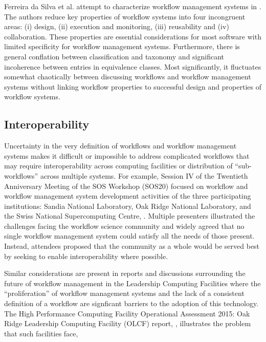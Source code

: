 Ferreira da Silva et al. attempt to characterize workflow management systems in 
\cite{ferreira_da_silva_characterization_nodate}. The authors reduce key properties of workflow
systems into four incongruent areas: (i) design, (ii) execution and monitoring, (iii)
reusability and (iv) collaboration. These properties are essential
considerations for most  software with limited specificity for workflow
management systems. Furthermore, there is general conflation between
classification and taxonomy and significant incoherence between entries in
equivalence classes. Most significantly, it fluctuates somewhat chaotically
between discussing workflows and workflow management systems without linking
workflow properties to successful design and properties of workflow systems.

\subsection{Interoperability}

Uncertainty in the very definition of workflows and workflow management systems makes it
difficult or impossible to address complicated workflows that may require interoperability
across computing facilities or distribution of ``sub-workflows'' across multiple systems.
For example, Session IV of the Twentieth Anniversary Meeting of the SOS Workshop
(SOS20) focused on workflow and workflow management
system development activities of the three participating institutions: Sandia
National Laboratory, Oak Ridge National Laboratory, and the Swiss National Supercomputing
Centre, \cite{pack_sos20_2016}. Multiple
presenters illustrated the challenges facing the workflow science community and
widely agreed that no single workflow management system could satisfy
all the needs of those present. Instead, attendees proposed that the community as a whole would
be served best by seeking to enable interoperability where possible. 

Similar considerations are present in reports and discussions surrounding the future of
workflow management in the Leadership Computing Facilities where the ``proliferation'' of
workflow management systems and the lack of a consistent definition of a workflow are 
signficant barriers to the adoption of this technology. The High Performance Computing Facility
Operational Assessment 2015: Oak Ridge Leadership Computing Facility (OLCF)
report, \cite{barker_scientific_2007}, illustrates the problem that such facilities
face,

